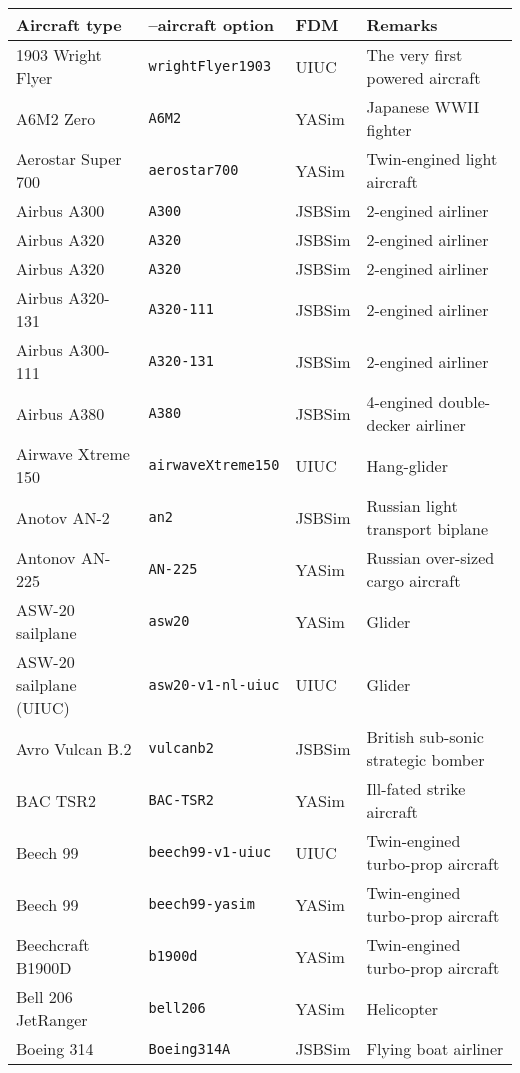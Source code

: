 \begin{tabular}{l|l|l|l}
Aircraft type       & --aircraft option & FDM    & Remarks\\\hline
   1903 Wright Flyer & \texttt{wrightFlyer1903} & UIUC & The very first powered aircraft\\
   A6M2 Zero        & \texttt{A6M2}       & YASim  &  Japanese WWII fighter\\
   Aerostar Super 700 & \texttt{aerostar700} & YASim & Twin-engined light aircraft\\
   Airbus A300      & \texttt{A300}       & JSBSim &  2-engined airliner \\
   Airbus A320      & \texttt{A320}       & JSBSim &  2-engined airliner \\
   Airbus A320      & \texttt{A320}       & JSBSim &  2-engined airliner \\
   Airbus A320-131  & \texttt{A320-111}   & JSBSim &  2-engined airliner \\
   Airbus A300-111  & \texttt{A320-131}   & JSBSim &  2-engined airliner \\
   Airbus A380      & \texttt{A380}       & JSBSim &  4-engined double-decker airliner \\
   Airwave Xtreme 150 & \texttt{airwaveXtreme150} & UIUC & Hang-glider \\
   Anotov AN-2 & \texttt{an2} & JSBSim & Russian light transport biplane\\
   Antonov AN-225   & \texttt{AN-225}     & YASim  &  Russian over-sized cargo aircraft\\
   ASW-20 sailplane & \texttt{asw20} & YASim & Glider\\
   ASW-20 sailplane (UIUC) & \texttt{asw20-v1-nl-uiuc} & UIUC & Glider\\
   Avro Vulcan B.2 & \texttt{vulcanb2} & JSBSim & British sub-sonic strategic bomber\\
   BAC TSR2         & \texttt{BAC-TSR2}   & YASim  &  Ill-fated strike aircraft\\
   Beech 99 & \texttt{beech99-v1-uiuc} & UIUC & Twin-engined turbo-prop aircraft\\
   Beech 99 & \texttt{beech99-yasim} & YASim & Twin-engined turbo-prop aircraft\\
   Beechcraft B1900D & \texttt{b1900d} & YASim & Twin-engined turbo-prop aircraft\\
   Bell 206 JetRanger & \texttt{bell206} & YASim & Helicopter\\
   Boeing 314       & \texttt{Boeing314A} & JSBSim &  Flying boat airliner \\

\end{tabular}
